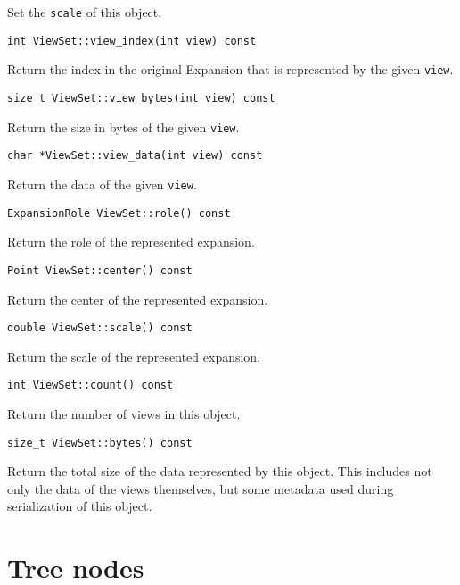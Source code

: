 \noindent Set the \texttt{scale} of this object.

\begin{lstlisting}
int ViewSet::view_index(int view) const
\end{lstlisting}

\noindent Return the index in the original Expansion that is represented by the
given \texttt{view}.

\begin{lstlisting}
size_t ViewSet::view_bytes(int view) const
\end{lstlisting}

\noindent Return the size in bytes of the given \texttt{view}.

\begin{lstlisting}
char *ViewSet::view_data(int view) const
\end{lstlisting}

\noindent Return the data of the given \texttt{view}.

\begin{lstlisting}
ExpansionRole ViewSet::role() const
\end{lstlisting}

\noindent Return the role of the represented expansion.

\begin{lstlisting}
Point ViewSet::center() const
\end{lstlisting}

\noindent Return the center of the represented expansion.

\begin{lstlisting}
double ViewSet::scale() const
\end{lstlisting}

\noindent Return the scale of the represented expansion.

\begin{lstlisting}
int ViewSet::count() const
\end{lstlisting}

\noindent Return the number of views in this object.

\begin{lstlisting}
size_t ViewSet::bytes() const
\end{lstlisting}

\noindent Return the total size of the data represented by this object. This
includes not only the data of the views themselves, but some metadata used
during serialization of this object.


\section{Tree nodes}

